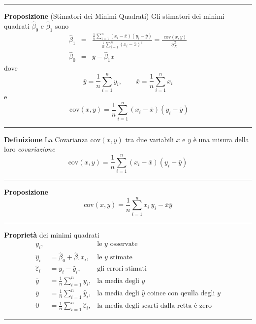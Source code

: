 \documentclass[
  11pt,
]{book}
\theoremstyle{mytheoremstyle}
\theoremstyle{mydefstyle}
\begin{document}
\begin{center}\rule{0.5\linewidth}{0.5pt}\end{center}

\textbf{Proposizione} (Stimatori dei Minimi Quadrati)
Gli stimatori dei minimi quadrati \(\hat\beta_0\) e \(\hat\beta_1\) sono
\begin{eqnarray*}
\hat\beta_1 &=& \frac{\frac 1 n\sum_{i=1}^n{(x_i-\bar x)(y_i-\bar y)}}{\frac 1 n\sum_{i=1}^n(x_i-\bar x)^2}=\frac{\text{ cov}(x,y)}{\hat\sigma^2_X}\\
\hat\beta_0 &=&\bar y -\hat\beta_1\bar x
\end{eqnarray*}
dove
\[\bar y = \frac 1 n\sum_{i=1}^n y_i,\qquad \bar x=\frac 1 n \sum_{i=1}^n x_i\]
e
\[
\text{ cov}(x,y) = \frac 1 n\sum_{i=1}^n(x_i-\bar x)(y_i-\bar y)
\]

\begin{center}\rule{0.5\linewidth}{0.5pt}\end{center}

\textbf{Definizione}
La Covarianza \(\text{cov}(x,y)\) tra due variabili \(x\) e \(y\) è una misura della loro \emph{covariazione}
\[\text{cov}(x,y)=\frac 1 n\sum_{i=1}^n{(x_i-\bar x)(y_i-\bar y)}\]

\begin{center}\rule{0.5\linewidth}{0.5pt}\end{center}

\textbf{Proposizione}
\[\text{cov}(x,y)=\frac 1 n\sum_{i=1}^nx_i~y_i-\bar x\bar y\]

\begin{center}\rule{0.5\linewidth}{0.5pt}\end{center}

\textbf{Proprietà} dei minimi quadrati
\[
\begin{aligned}
y_i, & & \text{le $y$ osservate}\\
\hat y_i &= \hat \beta_0+\hat\beta_1x_i,&\text{le $y$ stimate}\\
\hat\varepsilon_i &= y_i-\hat y_i,&\text{gli errori stimati}\\
\bar y &= \frac 1 n\sum_{i=1}^n y_i, &\text{la media degli $y$}\\
\bar y &= \frac 1 n\sum_{i=1}^n \hat y_i, &\text{la media degli $\hat y$ coince con qeulla degli $y$}\\
0 &=\frac 1 n\sum_{i=1}^n\hat\varepsilon_i , &\text{la media degli scarti dalla retta è zero}
\end{aligned}
\]

\begin{center}\rule{0.5\linewidth}{0.5pt}\end{center}
\end{document}
